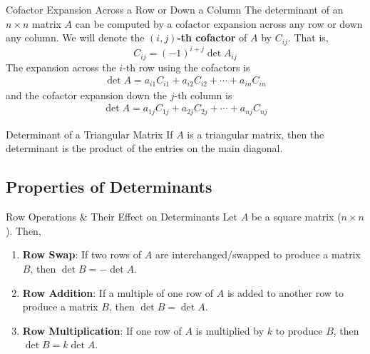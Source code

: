 \documentclass{article}
\begin{document}
\begin{theorem}{Cofactor Expansion Across a Row or Down a Column}
	The determinant of an $n \times n$ matrix $A$ can be computed by a cofactor expansion across any row or down any column. We will denote the \textbf{$(i, j)$-th cofactor} of $A$ by $C_{ij}$. That is,
	\begin{equation}
		C_{ij} = (-1)^{i+j}\det A_{ij}
	\end{equation}
	The expansion across the $i$-th row using the cofactors is
	\begin{equation}
		\begin{split}
			\det A = a_{i1}C_{i1} + a_{i2}C_{i2} + \cdots + a_{in}C_{in}
		\end{split}
	\end{equation}
	and the cofactor expansion down the $j$-th column is
	\begin{equation}
		\begin{split}
			\det A = a_{1j}C_{1j} + a_{2j}C_{2j} + \cdots + a_{nj}C_{nj}
		\end{split}
	\end{equation}
\end{theorem}

\begin{theorem}{Determinant of a Triangular Matrix}
	If $A$ is a triangular matrix, then the determinant is the product of the entries on the main diagonal.
\end{theorem}

\subsection{Properties of Determinants}
\begin{theorem}{Row Operations \& Their Effect on Determinants}
	Let $A$ be a square matrix ($n \times n$). Then,

	\begin{enumerate}[label=\alph*)]
		\item \textbf{Row Swap}:
		      If two rows of $A$ are interchanged/swapped to produce a matrix $B$, then $\det B = -\det A$.
		\item \textbf{Row Addition}:
		      If a multiple of one row of $A$ is added to another row to produce a matrix $B$, then $\det B = \det A$.
		\item \textbf{Row Multiplication}:
		      If one row of $A$ is multiplied by $k$ to produce $B$, then $\det B = k \det A$.
	\end{enumerate}
\end{theorem}
\end{document}
